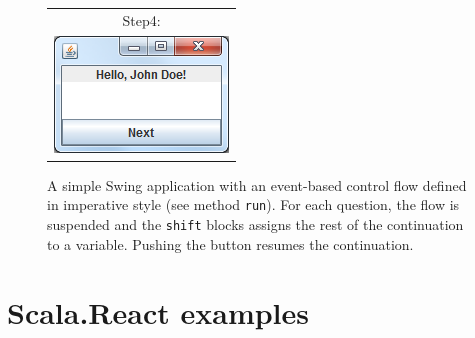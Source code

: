 \begin{figure}
\begin{minipage}{.3\linewidth}
\begin{tabular}{c}
Step4:\\
\includegraphics[width=0.9\linewidth]{images/swing-demo-step4.png} \\
\end{tabular}

    \end{minipage} 


\caption{A simple Swing application with an event-based control flow defined in imperative style (see method \texttt{run}). For each question, the flow is suspended and the \texttt{shift} blocks assigns the rest of the continuation to a variable. Pushing the button resumes the continuation.}
\label{fig:example_shift-reset-swing}
\end{figure}





\chapter{Scala.React examples}\label{chap:scala-react-examples}



